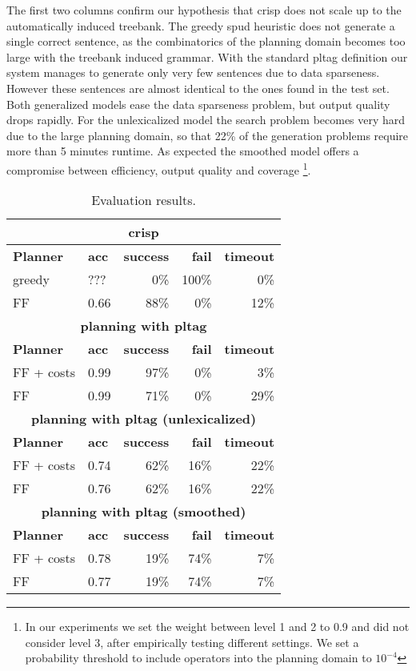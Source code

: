 The first two columns confirm our hypothesis that {\sc crisp} does not scale up to the automatically induced treebank. The greedy {\sc spud} heuristic does not generate a single correct sentence, as the combinatorics of the planning domain becomes too large with the treebank induced grammar. 
With the standard {\sc pltag} definition our system manages to generate only very few sentences due to data sparseness. However these sentences are almost identical to the ones found in the test set. Both generalized models ease the data sparseness problem, but output quality drops rapidly. For the unlexicalized model the search problem becomes very hard due to the large planning domain, so that 22\% of the generation problems require more than 5 minutes runtime. As expected the smoothed model offers a compromise between efficiency, output quality and coverage 
\footnote{In our experiments we set the weight between level 1 and 2 to 0.9 and did not consider level 3, after empirically testing different settings. We set a probability threshold to include operators into the planning domain to $10^{-4}$}.

\begin{table}
    \caption{\label{results} Evaluation results.}
    \begin{center}
    \begin{tabular}{|l|l|r|r|r|}
    \multicolumn{5}{c}{\sc crisp}\\ 
    \hline
     {\bf Planner }  & {\bf acc}& {\bf success} & {\bf fail} & {\bf timeout} \\ \hline 
     greedy         & ??? & 0\% & 100\% & 0\%  \\ \hline 
     FF         &  0.66 & 88\% & 0\% & 12\% \\ \hline 
    \multicolumn{5}{c}{\bf planning with {\sc pltag}}\\\hline
    {\bf Planner }  & {\bf acc}& {\bf success} & {\bf fail} & {\bf timeout} \\ \hline 
     FF + costs &  0.99 &  97\% & 0\% & 3\% \\ \hline
     FF         &  0.99 & 71\% & 0\% &  29\% \\ \hline
    \multicolumn{5}{c}{\bf planning with {\sc pltag} (unlexicalized)}\\\hline
    {\bf Planner }  & {\bf acc}& {\bf success} & {\bf fail} & {\bf timeout} \\ \hline 
     FF + costs & 0.74 & 62\% & 16\% & 22\%\\ \hline
     FF & 0.76 & 62\% & 16\% &  22\%\\ \hline
    \multicolumn{5}{c}{\bf planning with {\sc pltag} (smoothed)}\\\hline
    {\bf Planner }  & {\bf acc}& {\bf success} & {\bf fail} & {\bf timeout} \\ \hline 
     FF + costs & 0.78 & 19\% & 74\% & 7\% \\ \hline
     FF & 0.77 & 19\% & 74\% & 7\% \\ \hline
    \end{tabular}
    \end{center}
\end{table}


